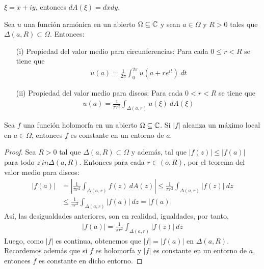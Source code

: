\begin{obs}
    $\xi = x + iy$, entonces $dA(\xi) = dxdy$.
\end{obs}

\begin{cor}
    Sea $u$ una función armónica en un abierto $\Omega \subseteq \mathbb{C}$ y sean $a \in \Omega$ y $R > 0$ tales que $\Delta(a,R) \subset \Omega$. Entonces:
    \begin{enumerate}
        \item[(i)] Propiedad del valor medio para circunferencias: Para cada $0 \leq r < R$ se tiene que
              \begin{align*}
                  u(a) = \frac{1}{2\pi}\int_{0}^{2\pi}{u\left(a + re^{it}\right) \ dt}
              \end{align*}
        \item[(ii)] Propiedad del valor medio para discos: Para cada $0 < r < R$ se tiene que
              \begin{align*}
                  u(a) = \frac{1}{\pi r^2}\int_{\Delta(a,r)}{u(\xi) \ dA(\xi)}
              \end{align*}
    \end{enumerate}
\end{cor}

\begin{teo}
    Sea $f$ una función holomorfa en un abierto $\Omega \subseteq \mathbb{C}$. Si $|f|$ alcanza un máximo local en $a \in \Omega$, entonces $f$ es constante en un entorno de $a$.
\end{teo}

\begin{proof}
    Sea $R > 0$ tal que $\Delta(a,R) \subset \Omega$  y además, tal que $|f(z)| \leq |f(a)|$ para todo $z \ in \Delta(a,R)$. Entonces para cada $r \in (o,R)$, por el teorema del valor medio para discos:
    \begin{align*}
        |f(a)| & = \left| \frac{1}{\pi r^2} \int_{\Delta(a,r)}{f(z) \ dA(z)} \right| \leq \frac{1}{\pi r^2} \int_{\Delta(a,r)}{|f(z)| \ dz} \\
               & \leq  \frac{1}{\pi r^2} \int_{\Delta(a,r)}{|f(a)| \ dz} = |f(a)|
    \end{align*}
    Así, las desigualdades anteriores, son en realidad, igualdades, por tanto,
    \begin{align*}
        |f(a)| = \frac{1}{\pi r^2} \int_{\Delta(a,r)}{|f(z)| \ dz}
    \end{align*}
    Luego, como $|f|$ es continua, obtenemos que $|f| = |f(a)|$ en $\Delta(a,R)$. Recordemos además que si $f$ es holomorfa y $|f|$ es constante en un entorno de $a$, entonces $f$ es constante en dicho entorno.
\end{proof}

